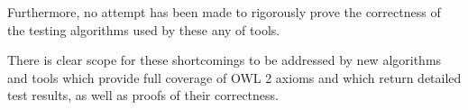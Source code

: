 \documentclass[paper.tex]{subfiles}
\begin{document}
Furthermore, no attempt has been made to rigorously prove the correctness of the testing algorithms used by these any of tools.

There is clear scope for these shortcomings to be addressed by new algorithms and tools which provide full coverage of OWL 2 axioms and which return detailed test results, as well as proofs of their correctness.
\end{document}
